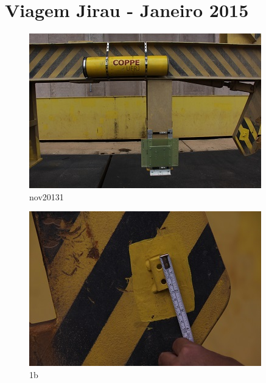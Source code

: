 \section{Viagem Jirau - Janeiro 2015}

\begin{figure}[h!]
\centering
  \includegraphics[width=1\linewidth]{Fotos/Janeiro2015/1.jpg}
  \caption{nov20131}
  \label{nov20131}
\end{figure}

\begin{figure}[h!]
  \centering
  \includegraphics[width=1\linewidth]{Fotos/Janeiro2015/2.jpg}
  \caption{1b}
  \label{nov20132}
\end{figure}


